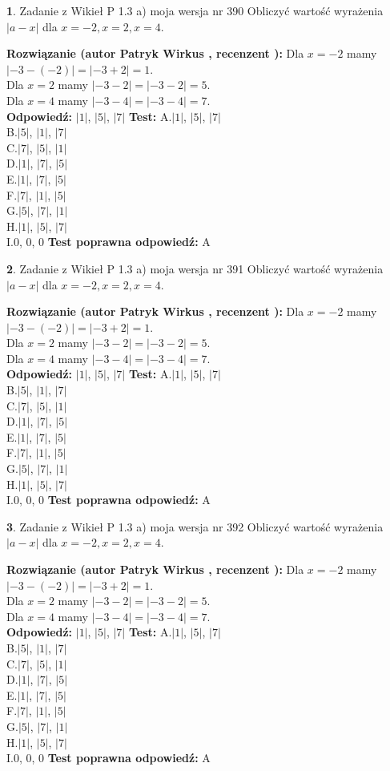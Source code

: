 \documentclass[12pt, a4paper]{article}
\theoremstyle{definition} %
\newtheorem{zad}{}
\newcommand{\zadStart}[1]{\begin{zad}#1\newline}
\newcommand{\zadStop}{\end{zad}}
\newcommand{\rozwStart}[2]{\noindent \textbf{Rozwiązanie (autor #1 , recenzent #2): }\newline}
\newcommand{\rozwStop}{\newline}
\newcommand{\odpStart}{\noindent \textbf{Odpowiedź:}\newline}
\newcommand{\odpStop}{\newline}
\newcommand{\testStart}{\noindent \textbf{Test:}\newline}
\newcommand{\testStop}{\newline}
\newcommand{\kluczStart}{\noindent \textbf{Test poprawna odpowiedź:}\newline}
\newcommand{\kluczStop}{\newline}
\begin{document}
\zadStart{Zadanie z Wikieł P 1.3 a) moja wersja nr 390}
Obliczyć wartość wyrażenia $|a - x|$ dla $x=-2,x=2,x=4$.
\zadStop
\rozwStart{Patryk Wirkus}{}
Dla $x = -2$ mamy $|-3 - (-2)| = |-3 + 2| = 1$.\\
Dla $x = 2$ mamy $|-3 - 2| = |-3 - 2| = 5$.\\
Dla $x = 4$ mamy $|-3 - 4| = |-3 - 4| = 7$.\\
\rozwStop
\odpStart
$|1|$, $|5|$, $|7|$
\odpStop
\testStart
A.$|1|$, $|5|$, $|7|$\\
B.$|5|$, $|1|$, $|7|$\\
C.$|7|$, $|5|$, $|1|$\\
D.$|1|$, $|7|$, $|5|$\\
E.$|1|$, $|7|$, $|5|$\\
F.$|7|$, $|1|$, $|5|$\\
G.$|5|$, $|7|$, $|1|$\\
H.$|1|$, $|5|$, $|7|$\\
I.$0$, $0$, $0$
\testStop
\kluczStart
A
\kluczStop



\zadStart{Zadanie z Wikieł P 1.3 a) moja wersja nr 391}
Obliczyć wartość wyrażenia $|a - x|$ dla $x=-2,x=2,x=4$.
\zadStop
\rozwStart{Patryk Wirkus}{}
Dla $x = -2$ mamy $|-3 - (-2)| = |-3 + 2| = 1$.\\
Dla $x = 2$ mamy $|-3 - 2| = |-3 - 2| = 5$.\\
Dla $x = 4$ mamy $|-3 - 4| = |-3 - 4| = 7$.\\
\rozwStop
\odpStart
$|1|$, $|5|$, $|7|$
\odpStop
\testStart
A.$|1|$, $|5|$, $|7|$\\
B.$|5|$, $|1|$, $|7|$\\
C.$|7|$, $|5|$, $|1|$\\
D.$|1|$, $|7|$, $|5|$\\
E.$|1|$, $|7|$, $|5|$\\
F.$|7|$, $|1|$, $|5|$\\
G.$|5|$, $|7|$, $|1|$\\
H.$|1|$, $|5|$, $|7|$\\
I.$0$, $0$, $0$
\testStop
\kluczStart
A
\kluczStop



\zadStart{Zadanie z Wikieł P 1.3 a) moja wersja nr 392}
Obliczyć wartość wyrażenia $|a - x|$ dla $x=-2,x=2,x=4$.
\zadStop
\rozwStart{Patryk Wirkus}{}
Dla $x = -2$ mamy $|-3 - (-2)| = |-3 + 2| = 1$.\\
Dla $x = 2$ mamy $|-3 - 2| = |-3 - 2| = 5$.\\
Dla $x = 4$ mamy $|-3 - 4| = |-3 - 4| = 7$.\\
\rozwStop
\odpStart
$|1|$, $|5|$, $|7|$
\odpStop
\testStart
A.$|1|$, $|5|$, $|7|$\\
B.$|5|$, $|1|$, $|7|$\\
C.$|7|$, $|5|$, $|1|$\\
D.$|1|$, $|7|$, $|5|$\\
E.$|1|$, $|7|$, $|5|$\\
F.$|7|$, $|1|$, $|5|$\\
G.$|5|$, $|7|$, $|1|$\\
H.$|1|$, $|5|$, $|7|$\\
I.$0$, $0$, $0$
\testStop
\kluczStart
A
\kluczStop
\end{document}
